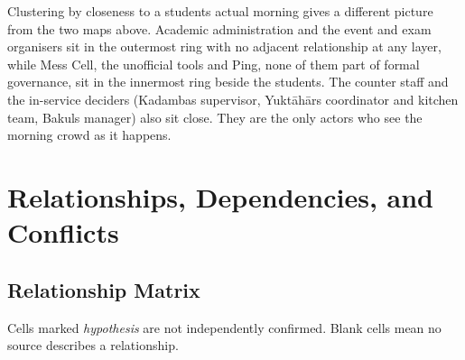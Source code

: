 \documentclass[
  10pt,
  table]{article}
\newcounter{none} %
\begin{document}
Clustering by closeness to a student\textquotesingle s actual morning gives a different picture from the two maps above. Academic administration and the event and exam organisers sit in the outermost ring with no adjacent relationship at any layer, while Mess Cell, the unofficial tools and Ping, none of them part of formal governance, sit in the innermost ring beside the students. The counter staff and the in-service deciders (Kadamba\textquotesingle s supervisor, Yuktāhār\textquotesingle s coordinator and kitchen team, Bakul\textquotesingle s manager) also sit close. They are the only actors who see the morning crowd as it happens.

\section{Relationships, Dependencies, and Conflicts}\label{relationships-dependencies-and-conflicts}

\subsection{Relationship Matrix}\label{relationship-matrix}

Cells marked \emph{hypothesis} are not independently confirmed. Blank cells mean no source describes a relationship.
\end{document}
